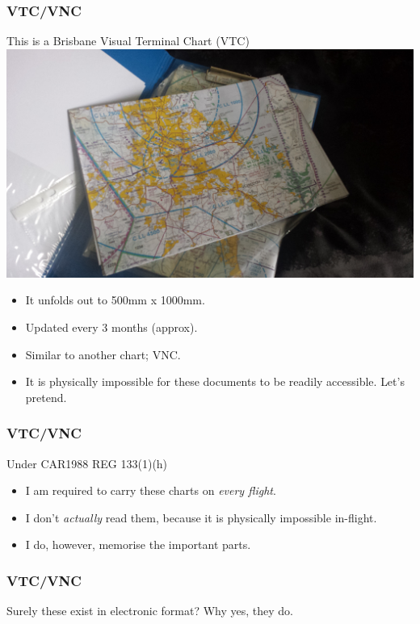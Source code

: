 \begin{frame}
\frametitle{VTC/VNC}
\begin{block}{This is a Brisbane Visual Terminal Chart (VTC)}
\includegraphics[height=0.3\textheight]{image/vtc.png}
\begin{itemize}
\item<1-> It unfolds out to 500mm x 1000mm.
\item<2-> Updated every 3 months (approx).
\item<3-> Similar to another chart; VNC.
\item<4-> It is physically impossible for these documents to be readily accessible. \tiny{Let's pretend.}
\end{itemize}
\end{block}
\end{frame}

\begin{frame}
\frametitle{VTC/VNC}
\begin{block}{Under CAR1988 REG 133(1)(h)}
\begin{itemize}
\item<1-> I am required to carry these charts on \emph{every flight}.
\item<2-> I don't \emph{actually} read them, because it is physically impossible in-flight.
\item<3-> I do, however, memorise the important parts.
\end{itemize}
\end{block}
\end{frame}

\begin{frame}
\frametitle{VTC/VNC}
\begin{block}{Surely these exist in electronic format?}
Why yes, they do.
\end{block}
\end{frame}

